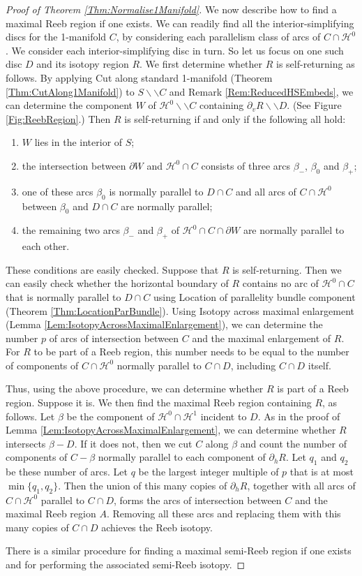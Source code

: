 \documentclass[10pt,a4paper]{amsart}
\newcommand{\calH}{\mathcal{H}}
\newcommand{\cut}{\backslash\backslash}
\begin{document}
\begin{proof}[Proof of Theorem \ref{Thm:Normalise1Manifold}]
We now describe how to find a maximal Reeb region if one exists. We can readily find all the interior-simplifying discs for the 1-manifold $C$, by considering each parallelism class of arcs of $C \cap \calH^0$. We consider each interior-simplifying disc in turn. So let us focus on one such disc $D$ and its isotopy region $R$. We first determine whether $R$ is self-returning as follows. By applying {\sc Cut along standard 1-manifold} (Theorem \ref{Thm:CutAlong1Manifold}) to $S \cut C$ and Remark \ref{Rem:ReducedHSEmbeds}, we can  determine the component $W$ of $\calH^0 \cut C$ containing $\partial_v R \cut D$. (See Figure \ref{Fig:ReebRegion}.) Then $R$ is self-returning if and only if the following all hold:
\begin{enumerate}
\item $W$ lies in the interior of $S$;
\item the intersection between $\partial W$ and $\calH^0 \cap C$ consists of three arcs $\beta_-$, $\beta_0$ and $\beta_+$;
\item one of these arcs $\beta_0$ is normally parallel to $D \cap C$ and all arcs of $C \cap \calH^0$ between $\beta_0$ and $D \cap C$ are normally parallel;
\item the remaining two arcs $\beta_-$ and $\beta_+$ of $\calH^0 \cap C \cap \partial W$ are normally parallel to each other.
\end{enumerate}
These conditions are easily checked. Suppose that $R$ is self-returning. Then we can easily check whether the horizontal boundary of $R$ contains no arc of $\calH^0 \cap C$ that is normally parallel to $D \cap C$ using {\sc Location of parallelity bundle component} (Theorem \ref{Thm:LocationParBundle}). Using {\sc Isotopy across maximal enlargement} (Lemma \ref{Lem:IsotopyAcrossMaximalEnlargement}), we can determine the number $p$ of arcs of intersection between $C$ and the maximal enlargement of $R$. For $R$ to be part of a Reeb region, this number needs to be equal to the number of components of $C \cap \calH^0$ normally parallel to $C \cap D$, including $C \cap D$ itself. 

Thus, using the above procedure, we can determine whether $R$ is part of a Reeb region. Suppose it is. We then find the maximal Reeb region containing $R$, as follows. Let $\beta$ be the component of $\calH^0 \cap \calH^1$ incident to $D$. As in the proof of Lemma \ref{Lem:IsotopyAcrossMaximalEnlargement}, we can determine whether $R$ intersects $\beta - D$. If it does not, then we cut $C$ along $\beta$ and count the number of components of $C - \beta$ normally parallel to each component of $\partial_h R$. Let $q_1$ and $q_2$ be these number of arcs. Let $q$ be the largest integer multiple of $p$ that is at most $\min \{ q_1, q_2 \}$. Then the union of this many copies of $\partial_h R$, together with all arcs of $C \cap \calH^0$ parallel to $C \cap D$, forms the arcs of intersection between $C$ and the maximal Reeb region $A$. Removing all these arcs and replacing them with this many copies of $C \cap D$ achieves the Reeb isotopy. 

There is a similar procedure for finding a maximal semi-Reeb region if one exists and for performing the associated semi-Reeb isotopy.
\end{proof}
\end{document}

